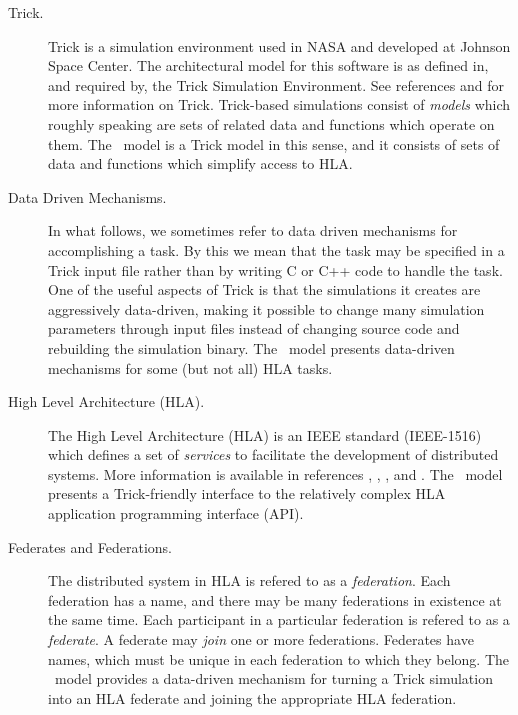 \begin{description}
\item[Trick.]
Trick is a simulation environment used in NASA and developed at
Johnson Space Center.
The architectural model for this software is as defined in, and
required by, the Trick Simulation Environment.  
See references \cite{Trick:Documentation} and \cite{Trick:Tutorial}
for more information on Trick.
Trick-based simulations consist of {\em models} which roughly speaking
are sets of related data and functions which operate on them.
The \TrickHLA\ model is a Trick model in this sense,
and it consists of sets of data and functions which simplify access to HLA.

\item[Data Driven Mechanisms.]
\label{sec:data-driven-mechanisms}
In what follows,
we sometimes refer to data driven mechanisms for accomplishing a task.
By this we mean that the task may be specified in a Trick input file
rather than by writing C or C++ code to handle the task.
One of the useful aspects of Trick is that the simulations it creates are
aggressively data-driven, making it possible to change many simulation 
parameters through input files instead of changing source code and rebuilding
the simulation binary.
The \TrickHLA\ model presents data-driven mechanisms for some (but not all)
HLA tasks.

\item[High Level Architecture (HLA).]
The High Level Architecture (HLA) is an IEEE standard (IEEE-1516)
which defines a set of {\em services} to facilitate the development
of distributed systems.
More information is available in references
\cite{IEEE1516:FRAMEWORK}, \cite{IEEE1516:API}, \cite{IEEE1516:OMT}, and
\cite{IEEE1730:DSEEP}.
The \TrickHLA\ model presents a Trick-friendly interface to the relatively
complex HLA application programming interface (API).

\item[Federates and Federations.]
The distributed system in HLA is refered to as a {\em federation}. 
Each federation has a name, and there may be many federations in existence
at the same time.
Each participant in a particular federation is refered to as a {\em federate}.
A federate may {\em join} one or more federations.
Federates have names, which must be unique in each federation to which they belong.
The \TrickHLA\ model provides a data-driven mechanism for turning a Trick
simulation into an HLA federate and joining the appropriate HLA federation.


\end{description}
